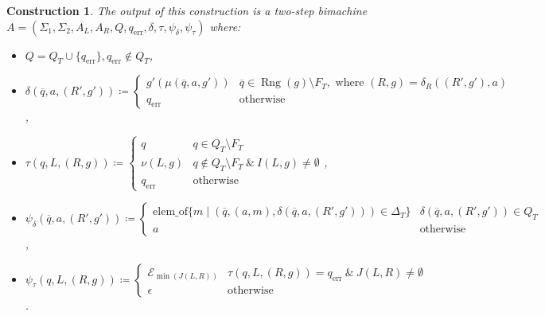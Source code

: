 \documentclass{article}
\newtheorem{construction}[definition]{Construction}
\DeclareMathOperator{\Rng}{Rng}
\begin{document}
\begin{construction}
		The output of this construction is a two-step bimachine $A=(\Sigma_1, \Sigma_2, A_L, A_R, Q, q_\mathrm{err}, \delta, \tau, \psi_\delta, \psi_\tau)$ where:
		\begin{itemize}
			\item \( Q = Q_T \cup \{ q_\mathrm{err} \}, q_\mathrm{err}\notin Q_T \),
			\item \( \delta(\overline{q}, a, (R', g')) \coloneq
			\begin{cases}
				g'(\mu(\overline{q}, a, g')) & \overline{q}\in \Rng(g)\setminus F_T,\text{ where }(R, g) = \delta_R((R', g'), a) \\
				q_\mathrm{err} & \text{otherwise}
			\end{cases}
			\),
			\item \( \tau(q, L, (R, g)) \coloneq
			\begin{cases}
				q & q\in Q_T \setminus F_T \\
				\nu(L, g) & q\notin Q_T \setminus F_T\ \&\ I(L, g)\ne \emptyset \\
				q_\mathrm{err} & \text{otherwise}
			\end{cases}
			\),
			\item \( \psi_\delta(\overline{q}, a, (R', g')) \coloneq
			\begin{cases}
				\mathrm{elem\_of}\{ m \mid (\overline{q}, (a, m), \delta(\overline{q}, a, (R', g')))\in \Delta_T \} & \delta(\overline{q}, a, (R', g'))\in Q_T \\
				a & \text{otherwise}
			\end{cases}
			\),
			\item \( \psi_\tau(q, L, (R, g)) \coloneq
			\begin{cases}
				\mathcal{E}_{\min(J(L, R))} & \tau(q, L, (R, g)) = q_\mathrm{err}\ \&\ J(L, R)\ne \emptyset \\
				\epsilon & \text{otherwise}
			\end{cases}
			\).
		\end{itemize}
	\end{construction}
\end{document}
